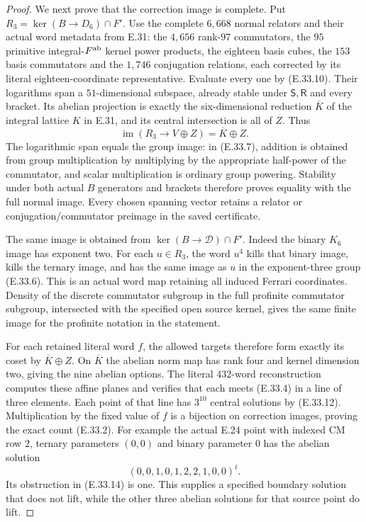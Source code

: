 \begin{proof}
We next prove that the correction image is complete.
Put $R_3=\ker(B\to D_6)\cap F'$.
Use the complete $6,668$ normal relators and their actual
word metadata from E.31: the $4,656$ rank-$97$
commutators, the $95$ primitive integral-$F^{\rm ab}$
kernel power products, the eighteen basis cubes,
the $153$ basis commutators and the $1,746$
conjugation relations, each corrected by its literal
eighteen-coordinate representative.  Evaluate every
one by \textup{(E.33.10)}.  Their logarithms span a
$51$-dimensional subspace, already stable under
$\mathsf S,\mathsf R$ and every bracket.  Its abelian
projection is exactly the six-dimensional reduction
$\overline K$ of the integral lattice $K$ in E.31,
and its central intersection is all of $Z$.  Thus
\[
       \operatorname{im}(R_3\to V\oplus Z)
                         =\overline K\oplus Z.
 \tag{E.33.15}
\]
The logarithmic span equals the group image: in
\textup{(E.33.7)}, addition is obtained from group
multiplication by multiplying by the appropriate
half-power of the commutator, and scalar multiplication
is ordinary group powering.  Stability under both actual
$B$ generators and brackets therefore proves equality
with the full normal image.  Every chosen spanning
vector retains a relator or conjugation/commutator
preimage in the saved certificate.

The same image is obtained from
$\ker(B\to\mathscr D)\cap F'$.
Indeed the binary $K_6$ image has exponent two.
For each $u\in R_3$, the word $u^4$ kills that binary
image, kills the ternary image, and has the same
image as $u$ in the exponent-three group
\textup{(E.33.6)}.  This is an actual word map
retaining all induced Ferrari coordinates.
Density of the discrete commutator subgroup in
the full profinite commutator subgroup, intersected
with the specified open source kernel, gives the
same finite image for the profinite notation in
the statement.

For each retained literal word $f$, the allowed targets
therefore form exactly its coset by
$\overline K\oplus Z$.  On $\overline K$ the abelian
norm map has rank four and kernel dimension two,
giving the nine abelian options.  The literal
$432$-word reconstruction computes these affine
planes and verifies that each meets
\textup{(E.33.4)} in a line of three elements.
Each point of that line has $3^{10}$ central
solutions by \textup{(E.33.12)}.  Multiplication
by the fixed value of $f$ is a bijection on
correction images, proving the exact count
\textup{(E.33.2)}.
For example the actual E.24 point with indexed
CM row $2$, ternary parameters $(0,0)$ and binary
parameter $0$ has the abelian solution
\[
                 (0,0,1,0,1,2,2,1,0,0)^t.
 \tag{E.33.16}
\]
Its obstruction in \textup{(E.33.14)} is one.
This supplies a specified boundary solution that
does not lift, while the other three abelian
solutions for that source point do lift.


\end{proof}
